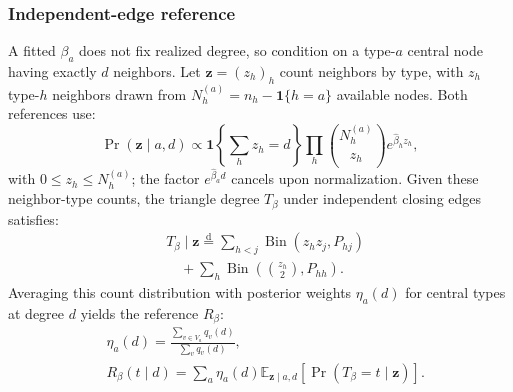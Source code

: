 \subsubsection{Independent-edge reference}
A fitted $\beta_a$ does not fix realized degree, so condition on a type-$a$ central node having exactly $d$ neighbors. Let $\mathbf z=(z_h)_h$ count neighbors by type, with $z_h$ type-$h$ neighbors drawn from $N_h^{(a)}=n_h-\mathbf1\{h=a\}$ available nodes. Both references use:
\begin{equation}
\Pr(\mathbf z\mid a,d)\propto
\mathbf1\!\left\{\sum_hz_h=d\right\}
\prod_h\binom{N_h^{(a)}}{z_h}e^{\widehat\beta_hz_h},
\label{eq:fixed_degree_composition}
\end{equation}
with $0\le z_h\le N_h^{(a)}$; the factor $e^{\widehat\beta_a d}$ cancels upon normalization. Given these neighbor-type counts, the triangle degree $T_\beta$ under independent closing edges satisfies:
\begin{equation}
\begin{aligned}
&T_\beta\mid\mathbf z\overset{\mathrm d}{=}
\sum_{h<j}\operatorname{Bin}(z_hz_j,P_{hj})\\
&\quad +\sum_h\operatorname{Bin}\!\left(\binom{z_h}{2},P_{hh}\right).
\end{aligned}
\label{eq:beta_conditional_count}
\end{equation}
Averaging this count distribution with posterior weights $\eta_a(d)$ for central types at degree $d$ yields the reference $R_\beta$:
\begin{equation}
\begin{aligned}
&\eta_a(d)=\frac{\sum_{v\in V_a}q_v(d)}{\sum_vq_v(d)},\\
&R_\beta(t\mid d)=\sum_a\eta_a(d)
\mathbb E_{\mathbf z\mid a,d}[\Pr(T_\beta=t\mid\mathbf z)].
\end{aligned}
\label{eq:beta_conditional_reference}
\end{equation}

